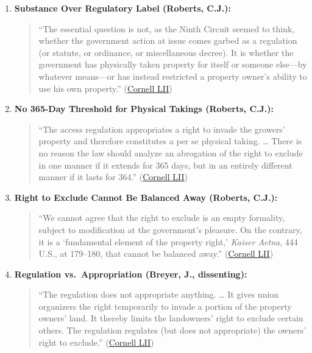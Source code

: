 \documentclass[12pt]{article}
\begin{document}
\begin{enumerate}
    \item \textbf{Substance Over Regulatory Label (Roberts, C.J.):}
    \begin{quote}
        ``The essential question is not, as the Ninth Circuit seemed to think, whether the government action at issue comes garbed as a regulation (or statute, or ordinance, or miscellaneous decree). It is whether the government has physically taken property for itself or someone else---by whatever means---or has instead restricted a property owner's ability to use his own property.'' (\href{https://www.law.cornell.edu/supremecourt/text/20-107}{Cornell LII})
    \end{quote}
    \item \textbf{No 365-Day Threshold for Physical Takings (Roberts, C.J.):}
    \begin{quote}
        ``The access regulation appropriates a right to invade the growers' property and therefore constitutes a per se physical taking. \ldots{} There is no reason the law should analyze an abrogation of the right to exclude in one manner if it extends for 365 days, but in an entirely different manner if it lasts for 364.'' (\href{https://www.law.cornell.edu/supremecourt/text/20-107}{Cornell LII})
    \end{quote}
    \item \textbf{Right to Exclude Cannot Be Balanced Away (Roberts, C.J.):}
    \begin{quote}
        ``We cannot agree that the right to exclude is an empty formality, subject to modification at the government's pleasure. On the contrary, it is a `fundamental element of the property right,' \textit{Kaiser Aetna}, 444 U.S., at 179--180, that cannot be balanced away.'' (\href{https://www.law.cornell.edu/supremecourt/text/20-107}{Cornell LII})
    \end{quote}
    \item \textbf{Regulation vs.\ Appropriation (Breyer, J., dissenting):}
    \begin{quote}
        ``The regulation does not appropriate anything. \ldots{} It gives union organizers the right temporarily to invade a portion of the property owners' land. It thereby limits the landowners' right to exclude certain others. The regulation regulates (but does not appropriate) the owners' right to exclude.'' (\href{https://www.law.cornell.edu/supremecourt/text/20-107}{Cornell LII})
    \end{quote}
\end{enumerate}
\end{document}
